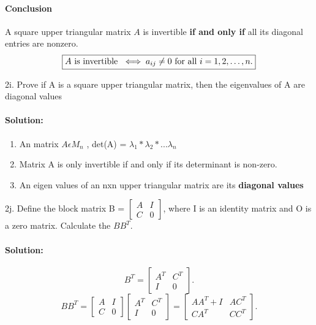 \documentclass[12pt,letterpaper]{article}
\begin{document}
\paragraph{Conclusion}
A square upper triangular matrix \( A \) is invertible \textbf{if and only if} all its diagonal entries are nonzero. 
\[
\boxed{\text{\( A \) is invertible } \iff a_{ij} \neq 0 \text{ for all } i = 1, 2, \dots, n.}
\]

\vspace{1.2cm}

2i. Prove if A is a square upper triangular matrix, then the eigenvalues of A are diagonal values

\paragraph*{Solution:}
\begin{enumerate}
    \item An matrix $A \epsilon M_n$ ,
    det(A) = $\lambda_1 * \lambda_2 * ... \lambda_n$
    \item Matrix A is only invertible if and only if its determinant is non-zero.
    \item An eigen values of an nxn upper triangular matrix are its \textbf{diagonal values}
\end{enumerate}

\pagebreak

2j. Define the block matrix B = \(
\begin{bmatrix}
    A & I \\
    C & 0 
\end{bmatrix}
\), where I is an identity matrix and O is a zero matrix. Calculate the $BB^T$.

\paragraph{Solution:}
\[
B^T = \begin{bmatrix}
    A^T & C^T \\
    I & 0 
\end{bmatrix}.
\]
\[
BB^T = \begin{bmatrix}
    A & I \\
    C & 0 
\end{bmatrix}
\begin{bmatrix}
    A^T & C^T \\
    I & 0 
\end{bmatrix}
= \begin{bmatrix}
    AA^T + I & AC^T \\
    CA^T & CC^T 
\end{bmatrix}.
\]
\end{document}
